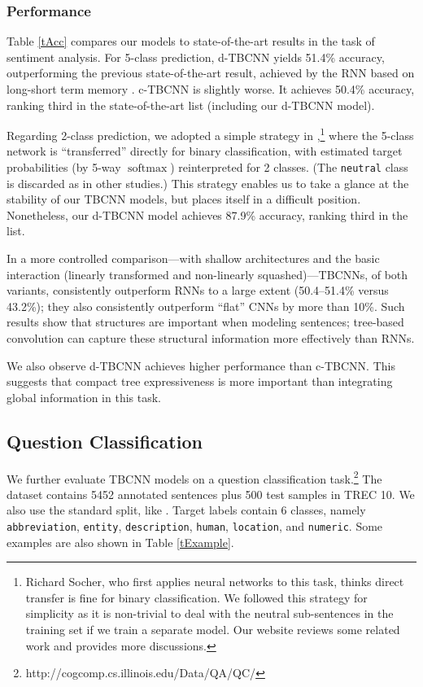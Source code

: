 \documentclass[11pt,a4paper]{article}
\begin{document}
\subsubsection{Performance}
Table \ref{tAcc} compares our models to state-of-the-art results in the task of sentiment analysis.
For 5-class prediction, d-TBCNN yields 51.4\% accuracy, outperforming the previous state-of-the-art result,
achieved by the RNN based on long-short term memory \cite{lstm1}.
c-TBCNN is slightly worse.
It achieves 50.4\% accuracy, ranking third in the
state-of-the-art list (including our d-TBCNN model).


Regarding 2-class prediction, we adopted a simple strategy in ,\footnote{
Richard Socher, who first applies neural networks to this task,
thinks direct transfer is fine for binary classification. 
We followed this strategy for simplicity
as it is non-trivial to deal with the neutral sub-sentences in the training set 
if we train a  separate model. 
Our website reviews some related work and provides more discussions.}
where the 5-class network is ``transferred'' directly for binary classification,
with estimated target probabilities
(by 5-way $\operatorname{softmax}$) reinterpreted for 2 classes.
(The \verb|neutral| class is discarded as in other studies.)
This strategy enables us to take a glance at the stability of our TBCNN models, but places
itself in a difficult position. Nonetheless, our d-TBCNN model achieves 87.9\%
accuracy, ranking third in the list.


In a more controlled comparison---with shallow architectures and the basic interaction 
(linearly transformed and non-linearly squashed)---TBCNNs, of both variants, consistently outperform RNNs \cite{RAE}
to a large extent (50.4--51.4\% versus 43.2\%);
they also consistently outperform ``flat'' CNNs by more than 10\%.
Such results show that structures are important when modeling sentences;
tree-based convolution can capture these structural information more effectively than RNNs.

We also observe d-TBCNN achieves higher performance than c-TBCNN. This suggests that
compact tree expressiveness is more important than integrating global information
in this task.



\subsection{Question Classification}\label{ssQuestion}
We further evaluate TBCNN models on a question classification task.\footnote{
http://cogcomp.cs.illinois.edu/Data/QA/QC/} The dataset contains 5452 annotated sentences plus 500 test samples in TREC 10.
We also use the standard split, like .
Target labels contain 6 classes, namely
\verb"abbreviation", \verb"entity", \verb"description", \verb"human",
\verb"location", and \verb"numeric".
Some examples are also shown in Table \ref{tExample}.
\end{document}
